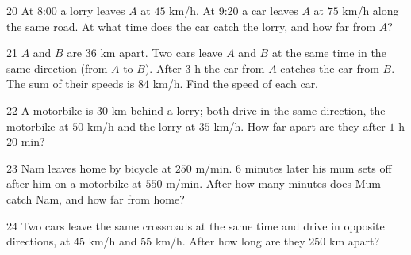 \gap
\begin{probbox}{20}{\relax}
At 8:00 a lorry leaves $A$ at $45$ km/h. At 9:20 a car leaves $A$ at $75$ km/h along the same road. At what time does the car catch the lorry, and how far from $A$?
\end{probbox}
\gap
\begin{probbox}{21}{\relax}
$A$ and $B$ are $36$ km apart. Two cars leave $A$ and $B$ at the same time in the same direction (from $A$ to $B$). After $3$ h the car from $A$ catches the car from $B$. The sum of their speeds is $84$ km/h. Find the speed of each car.
\end{probbox}
\gap
\begin{probbox}{22}{\relax}
A motorbike is $30$ km behind a lorry; both drive in the same direction, the motorbike at $50$ km/h and the lorry at $35$ km/h. How far apart are they after $1$ h $20$ min?
\end{probbox}
\gap
\begin{probbox}{23}{\relax}
Nam leaves home by bicycle at $250$ m/min. $6$ minutes later his mum sets off after him on a motorbike at $550$ m/min. After how many minutes does Mum catch Nam, and how far from home?
\end{probbox}
\gap
\begin{probbox}{24}{\relax}
Two cars leave the same crossroads at the same time and drive in opposite directions, at $45$ km/h and $55$ km/h. After how long are they $250$ km apart?
\end{probbox}
